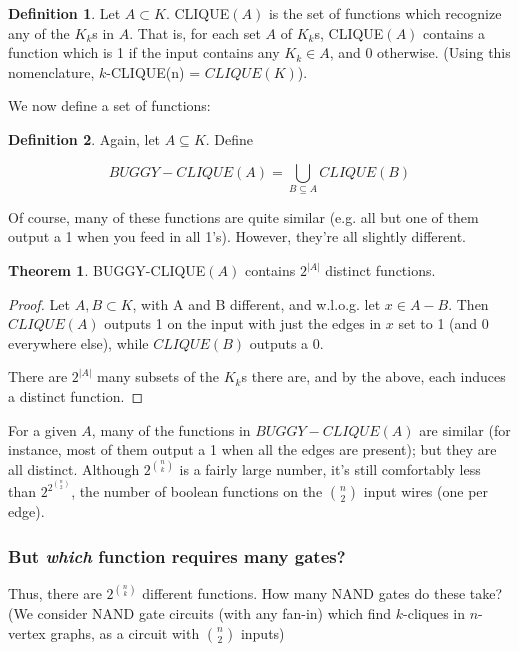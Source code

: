 \documentclass[12pt]{article}
\theoremstyle{definition}
\newtheorem{thm}{Theorem}[section]
\newtheorem{defn}{Definition}[section]
\begin{document}
\begin{defn}
\label{CLIQUE}
Let $A \subset K$.
CLIQUE$(A)$ is the set of functions which recognize any of the $K_k$s in $A$. That is, for each set $A$ of $K_k$s, CLIQUE$(A)$
contains a function which is 1 if the input contains any $K_k \in A$,
and 0 otherwise. (Using this nomenclature,
$k$-CLIQUE(n) = $CLIQUE(K)$).
\end{defn}

We now define a set of functions:

\begin{defn}
\label{BUGGY-CLIQUE}
Again, let $A \subseteq K$. Define

\[
BUGGY-CLIQUE(A) = \bigcup_{B \subseteq A} CLIQUE(B)
\]
\end{defn}



Of course, many of these functions are quite similar (e.g. all but one of them
output a 1 when you feed in all 1's). However, they're all slightly different.

\begin{thm}
\label{buggyDistinct}
BUGGY-CLIQUE$(A)$ contains $2^{|A|}$ distinct functions.
\end{thm}
\begin{proof}

Let $A,B \subset K$, with A and B different, and w.l.o.g.
let $x \in A-B$. Then $CLIQUE(A)$ outputs 1 on the input
with just the edges in $x$ set to 1 (and 0 everywhere else),
while $CLIQUE(B)$ outputs a 0.

There are $2^{|A|}$ many subsets of the $K_k$s there are,
and by the above, each induces a distinct function.
\end{proof}

For a given $A$, many of the functions in $BUGGY-CLIQUE(A)$
are similar (for instance, most
of them output a 1 when all the edges are present);
but they are all distinct.
Although $2^{n \choose k}$ is a fairly large number,
it's still comfortably less than $2^{2^{n \choose 2}}$, the number of boolean
functions on the ${n \choose 2}$ input wires (one per edge).

\subsubsection{But {\em which} function requires many gates?}

Thus, there are $2^{n \choose k}$ different functions. 
How many NAND gates do these take?
(We consider NAND gate circuits (with any fan-in) which find $k$-cliques in $n$-vertex
graphs, as a circuit with $n \choose 2$ inputs)
\end{document}
